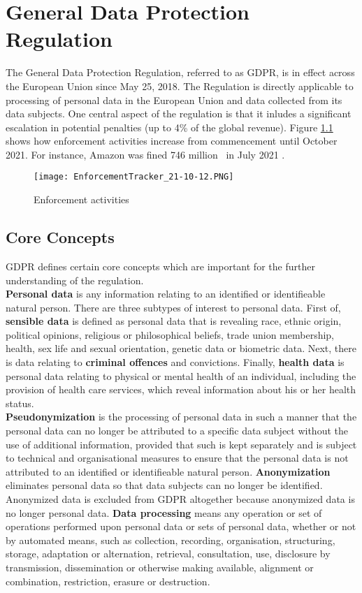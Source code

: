 \documentclass[a4paper,12pt]{report}
\begin{document}
	\chapter{General Data Protection Regulation}  \label{GDPR}
	The General Data Protection Regulation, referred to as GDPR, is in effect across the European Union since May 25, 2018.
	The Regulation is directly applicable to processing of personal data in the European Union and data collected from its data subjects.
	One central aspect of the regulation is that it inludes a significant escalation in potential penalties (up to 4\% of the global revenue).
	Figure \ref{fig:enforcement_tracker} shows how enforcement activities increase from commencement until October 2021.
	For instance, Amazon was fined 746 million \texteuro \ in July 2021 \cite{EnforcementTracker}.
	\begin{figure}
		\centering
		\texttt{[image: EnforcementTracker\_21-10-12.PNG]}
		\caption{Enforcement activities \cite{EnforcementTracker}}
		\label{fig:enforcement_tracker}
	\end{figure}
	
	\section{Core Concepts}
	\startsection
	GDPR defines certain core concepts which are important for the further understanding of the regulation.\\
	\textbf{Personal data} is any information relating to an identified or identifieable natural person.
	There are three subtypes of interest to personal data. 
	First of, \textbf{sensible data} is defined as personal data that is revealing race, ethnic origin, political opinions, religious or philosophical beliefs, trade union membership, health, sex life and sexual orientation, genetic data or biometric data.
	Next, there is data relating to \textbf{criminal offences} and convictions.
	Finally, \textbf{health data} is personal data relating to physical or mental health of an individual, including the provision of health care services, which reveal information about his or her health status.\\
	\textbf{Pseudonymization} is the processing of personal data in such a manner that the personal data can no longer be attributed to a specific data subject without the use of additional information, provided that such is kept separately and is subject to technical and organisational measures to ensure that the personal data is not attributed to an identified or identifieable natural person.
	\textbf{Anonymization} eliminates personal data so that data subjects can no longer be identified. 
	Anonymized data is excluded from GDPR altogether because anonymized data is no longer personal data.
	\textbf{Data processing} means any operation or set of operations performed upon personal data or sets of personal data, whether or not by automated means, such as collection, recording, organisation, structuring, storage, adaptation or alternation, retrieval, consultation, use, disclosure by transmission, dissemination or otherwise making available, alignment or combination, restriction, erasure or destruction.
	\closesection
\end{document}
